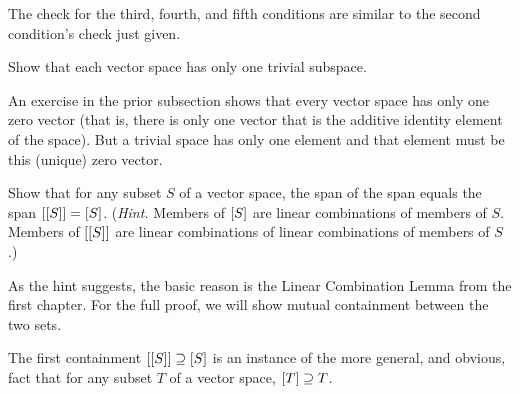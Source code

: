 \begin{exercises}
\begin{answer}
      The check for the third, fourth, and fifth conditions are similar to the
      second condition's check just given.  
    \end{answer}
  \item 
    Show that each vector space has only one trivial subspace.
    \begin{answer}
      An exercise in the prior subsection shows that every vector space
      has only one zero vector (that is, there is only one vector that is the
      additive identity element of the space).
      But a trivial space has only one element and that element must be this
      (unique) zero vector.
    \end{answer}
  \recommended \item 
    Show that for any subset \( S \) of a vector space,
    the span of the span equals the span 
    \( \relax [ \relax [S\relax ] \relax ]=\relax [S\relax ] \).
    (\textit{Hint.} 
    Members of $\relax [S\relax ]$ are linear combinations of members of $S$.
    Members of $\relax [\relax [S\relax ]\relax ]$ are linear combinations of 
    linear combinations of members of $S$.)
    \begin{answer}
      As the hint suggests, the basic reason is the Linear Combination Lemma
      from the first chapter.
      For the full proof, we will show mutual containment between the two sets.

      The first containment \( \relax [ \relax [S\relax ] \relax ]\supseteq\relax [S\relax ]  \)
      is an instance of the more general, and obvious, fact that for any 
      subset \( T \) of a vector space, \( \relax [T\relax ]\supseteq T \).


\end{answer}
\end{exercises}
